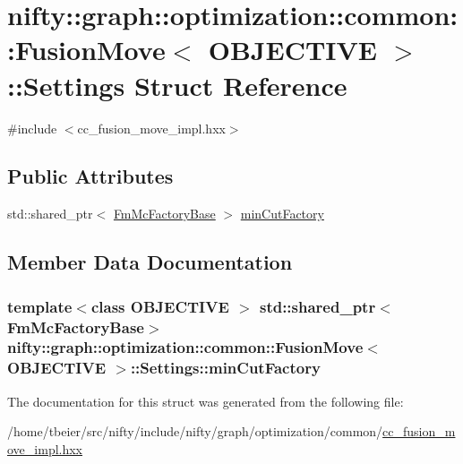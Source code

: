 \hypertarget{structnifty_1_1graph_1_1optimization_1_1common_1_1FusionMove_1_1Settings}{}\section{nifty\+:\+:graph\+:\+:optimization\+:\+:common\+:\+:Fusion\+Move$<$ O\+B\+J\+E\+C\+T\+I\+V\+E $>$\+:\+:Settings Struct Reference}
\label{structnifty_1_1graph_1_1optimization_1_1common_1_1FusionMove_1_1Settings}


{\ttfamily \#include $<$cc\+\_\+fusion\+\_\+move\+\_\+impl.\+hxx$>$}

\subsection*{Public Attributes}
\begin{DoxyCompactItemize}
\item 
std\+::shared\+\_\+ptr$<$ \hyperlink{classnifty_1_1graph_1_1optimization_1_1common_1_1FusionMove_a6af63b2ed662deb28c716c462669cb37}{Fm\+Mc\+Factory\+Base} $>$ \hyperlink{structnifty_1_1graph_1_1optimization_1_1common_1_1FusionMove_1_1Settings_a791cce76746e871154dab45e0bf00454}{min\+Cut\+Factory}
\end{DoxyCompactItemize}


\subsection{Member Data Documentation}
\hypertarget{structnifty_1_1graph_1_1optimization_1_1common_1_1FusionMove_1_1Settings_a791cce76746e871154dab45e0bf00454}{}
\subsubsection[{min\+Cut\+Factory}]{\setlength{\rightskip}{0pt plus 5cm}template$<$class O\+B\+J\+E\+C\+T\+I\+V\+E $>$ std\+::shared\+\_\+ptr$<${\bf Fm\+Mc\+Factory\+Base}$>$ {\bf nifty\+::graph\+::optimization\+::common\+::\+Fusion\+Move}$<$ O\+B\+J\+E\+C\+T\+I\+V\+E $>$\+::Settings\+::min\+Cut\+Factory}\label{structnifty_1_1graph_1_1optimization_1_1common_1_1FusionMove_1_1Settings_a791cce76746e871154dab45e0bf00454}


The documentation for this struct was generated from the following file\+:\begin{DoxyCompactItemize}
\item 
/home/tbeier/src/nifty/include/nifty/graph/optimization/common/\hyperlink{cc__fusion__move__impl_8hxx}{cc\+\_\+fusion\+\_\+move\+\_\+impl.\+hxx}\end{DoxyCompactItemize}
